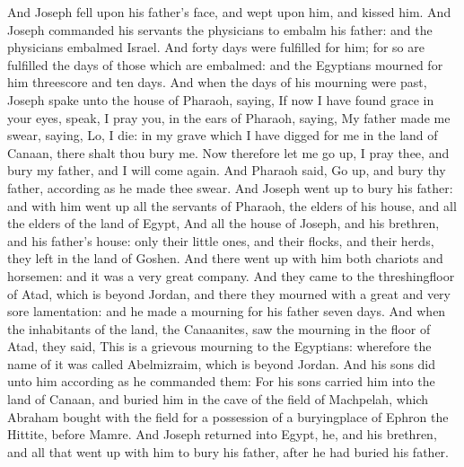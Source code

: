\begin{biblechapter} %
\verse And Joseph fell upon his father's face, and wept upon him, and kissed him.
\verse And Joseph commanded his servants the physicians to embalm his father: and the physicians embalmed Israel.
\verse And forty days were fulfilled for him; for so are fulfilled the days of those which are embalmed: and the Egyptians mourned for him threescore and ten days.
\verse And when the days of his mourning were past, Joseph spake unto the house of Pharaoh, saying, If now I have found grace in your eyes, speak, I pray you, in the ears of Pharaoh, saying,
\verse My father made me swear, saying, Lo, I die: in my grave which I have digged for me in the land of Canaan, there shalt thou bury me. Now therefore let me go up, I pray thee, and bury my father, and I will come again.
\verse And Pharaoh said, Go up, and bury thy father, according as he made thee swear.
\verse And Joseph went up to bury his father: and with him went up all the servants of Pharaoh, the elders of his house, and all the elders of the land of Egypt,
\verse And all the house of Joseph, and his brethren, and his father's house: only their little ones, and their flocks, and their herds, they left in the land of Goshen.
\verse And there went up with him both chariots and horsemen: and it was a very great company.
\verse And they came to the threshingfloor of Atad, which is beyond Jordan, and there they mourned with a great and very sore lamentation: and he made a mourning for his father seven days.
\verse And when the inhabitants of the land, the Canaanites, saw the mourning in the floor of Atad, they said, This is a grievous mourning to the Egyptians: wherefore the name of it was called Abelmizraim, which is beyond Jordan.
\verse And his sons did unto him according as he commanded them:
\verse For his sons carried him into the land of Canaan, and buried him in the cave of the field of Machpelah, which Abraham bought with the field for a possession of a buryingplace of Ephron the Hittite, before Mamre.
\verse And Joseph returned into Egypt, he, and his brethren, and all that went up with him to bury his father, after he had buried his father.

\end{biblechapter}
